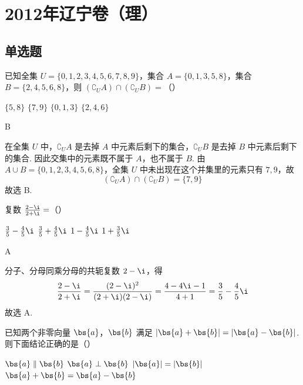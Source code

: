 \chapter{2012年辽宁卷（理）}

\section{单选题}

\begin{problem}
已知全集 \(U = \{0, 1, 2, 3, 4, 5, 6, 7, 8, 9\}\)，集合 \(A = \{0, 1, 3, 5, 8\}\)，集合 \(B = \{2, 4, 5, 6, 8\}\)，则 \((\complement_U A) \cap (\complement_U B) =\)（\quad）

\choices
    {\(\{5,8\}\)}
    {\(\{7,9\}\)}
    {\(\{0,1,3\}\)}
    {\(\{2,4,6\}\)}
\end{problem}

\begin{answer}
B
\end{answer}

\begin{solution}
在全集 \(U\) 中，\(\complement_U A\) 是去掉 \(A\) 中元素后剩下的集合，\(\complement_U B\) 是去掉 \(B\) 中元素后剩下的集合. 因此交集中的元素既不属于 \(A\)，也不属于 \(B\). 由 \(A\cup B=\{0,1,2,3,4,5,6,8\}\)，全集 \(U\) 中未出现在这个并集里的元素只有 \(7,9\)，故
\[
(\complement_U A)\cap(\complement_U B)=\{7,9\}
\]
故选 B.
\end{solution}

\begin{problem}
复数 \(\frac{2 - \i}{2 + \i} =\)（\quad）

\choices
    {\(\frac{3}{5} - \frac{4}{5}\i\)}
    {\(\frac{3}{5} + \frac{4}{5}\i\)}
    {\(1 - \frac{4}{5}\i\)}
    {\(1 + \frac{3}{5}\i\)}
\end{problem}

\begin{answer}
A
\end{answer}

\begin{solution}
分子、分母同乘分母的共轭复数 \(2-\i\)，得
\[
\frac{2-\i}{2+\i}=\frac{(2-\i)^2}{(2+\i)(2-\i)}=\frac{4-4\i-1}{4+1}=\frac35-\frac45\i
\]
故选 A.
\end{solution}

\begin{problem}
已知两个非零向量 \(\bs{a}\)，\(\bs{b}\) 满足 \(|\bs{a} + \bs{b}| = |\bs{a} - \bs{b}|\). 则下面结论正确的是（\quad）

\choices
    {\(\bs{a} \parallel \bs{b}\)}
    {\(\bs{a} \perp \bs{b}\)}
    {\(|\bs{a}| = |\bs{b}|\)}
    {\(\bs{a} + \bs{b} = \bs{a} - \bs{b}\)}
\end{problem}

